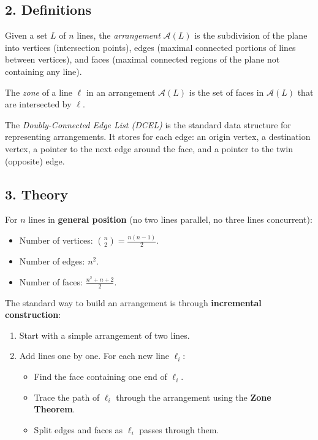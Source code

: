\subsection{2. Definitions}
\begin{definition}[Arrangement]
\label{def:la_arrangement}
Given a set $L$ of $n$ lines, the \emph{arrangement} $\mathcal{A}(L)$ is the subdivision of the plane into vertices (intersection points), edges (maximal connected portions of lines between vertices), and faces (maximal connected regions of the plane not containing any line).
\end{definition}

\begin{definition}[Zone]
\label{def:la_zone}
The \emph{zone} of a line $\ell$ in an arrangement $\mathcal{A}(L)$ is the set of faces in $\mathcal{A}(L)$ that are intersected by $\ell$.
\end{definition}

\begin{definition}[DCEL]
\label{def:la_dcel}
The \emph{Doubly-Connected Edge List (DCEL)} is the standard data structure for representing arrangements. It stores for each edge: an origin vertex, a destination vertex, a pointer to the next edge around the face, and a pointer to the twin (opposite) edge.
\end{definition}

\subsection{3. Theory}
For $n$ lines in \textbf{general position} (no two lines parallel, no three lines concurrent):
\begin{itemize}
    \item Number of vertices: $\binom{n}{2} = \frac{n(n-1)}{2}$.
    \item Number of edges: $n^2$.
    \item Number of faces: $\frac{n^2 + n + 2}{2}$.
\end{itemize}

The standard way to build an arrangement is through \textbf{incremental construction}:
\begin{enumerate}
    \item Start with a simple arrangement of two lines.
    \item Add lines one by one. For each new line $\ell_i$:
    \begin{itemize}
        \item Find the face containing one end of $\ell_i$.
        \item Trace the path of $\ell_i$ through the arrangement using the \textbf{Zone Theorem}.
        \item Split edges and faces as $\ell_i$ passes through them.
    \end{itemize}
\end{enumerate}

